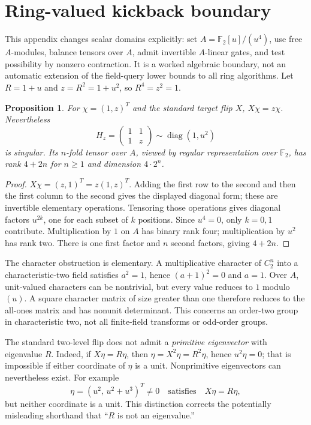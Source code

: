 \documentclass[11pt]{article}
\newtheorem{proposition}[theorem]{Proposition}
\newcommand{\F}{\mathbb F}
\newcommand{\A}{\F_2[u]/(u^4)}
\DeclareMathOperator{\diag}{diag}
\begin{document}
\appendix
\section{Ring-valued kickback boundary}\label{sec:phase}
This appendix changes scalar domains explicitly: set $A=\A$, use free $A$-modules, balance tensors over $A$, admit invertible $A$-linear gates, and test possibility by nonzero contraction. It is a worked algebraic boundary, not an automatic extension of the field-query lower bounds to all ring algorithms. Let $R=1+u$ and $z=R^2=1+u^2$, so $R^4=z^2=1$.

\begin{proposition}\label{prop:phase}
For $\chi=(1,z)^T$ and the standard target flip $X$, $X\chi=z\chi$. Nevertheless
\[
 H_z=\begin{pmatrix}1&1\\1&z\end{pmatrix}
       \sim\diag(1,u^2)
\]
is singular. Its $n$-fold tensor over $A$, viewed by regular representation over $\F_2$, has rank $4+2n$ for $n\ge1$ and dimension $4\cdot2^n$.
\end{proposition}
\begin{proof}
$X\chi=(z,1)^T=z(1,z)^T$. Adding the first row to the second and then the first column to the second gives the displayed diagonal form; these are invertible elementary operations. Tensoring those operations gives diagonal factors $u^{2k}$, one for each subset of $k$ positions. Since $u^4=0$, only $k=0,1$ contribute. Multiplication by $1$ on $A$ has binary rank four; multiplication by $u^2$ has rank two. There is one first factor and $n$ second factors, giving $4+2n$.
\end{proof}



The character obstruction is elementary. A multiplicative character of $C_2^n$ into a characteristic-two field satisfies $a^2=1$, hence $(a+1)^2=0$ and $a=1$. Over $A$, unit-valued characters can be nontrivial, but every value reduces to $1$ modulo $(u)$. A square character matrix of size greater than one therefore reduces to the all-ones matrix and has nonunit determinant. This concerns an order-two group in characteristic two, not all finite-field transforms or odd-order groups.

The standard two-level flip does not admit a \emph{primitive eigenvector} with eigenvalue $R$. Indeed, if $X\eta=R\eta$, then $\eta=X^2\eta=R^2\eta$, hence $u^2\eta=0$; that is impossible if either coordinate of $\eta$ is a unit. Nonprimitive eigenvectors can nevertheless exist. For example
\[
 \eta=(u^2,\,u^2+u^3)^T\ne0
 \quad\text{satisfies}\quad
 X\eta=R\eta,
\]
but neither coordinate is a unit. This distinction corrects the potentially misleading shorthand that ``$R$ is not an eigenvalue.''
\end{document}
